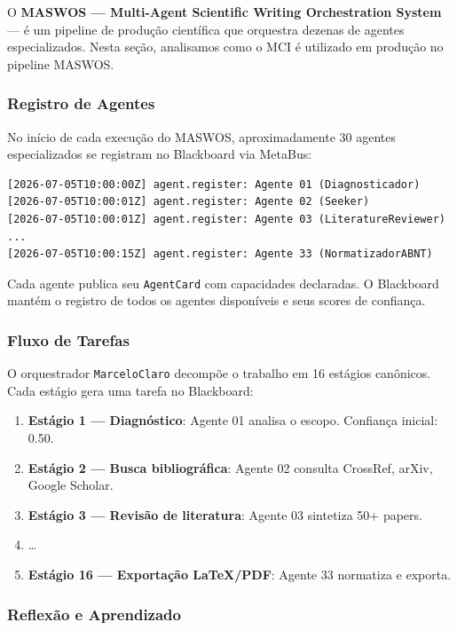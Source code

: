 O \textbf{MASWOS — Multi-Agent Scientific Writing Orchestration System} — é um pipeline de produção científica que orquestra dezenas de agentes especializados. Nesta seção, analisamos como o MCI é utilizado em produção no pipeline MASWOS.

\subsubsection{Registro de Agentes}

No início de cada execução do MASWOS, aproximadamente 30 agentes especializados se registram no Blackboard via MetaBus:

\begin{verbatim}
[2026-07-05T10:00:00Z] agent.register: Agente 01 (Diagnosticador)
[2026-07-05T10:00:01Z] agent.register: Agente 02 (Seeker)
[2026-07-05T10:00:01Z] agent.register: Agente 03 (LiteratureReviewer)
...
[2026-07-05T10:00:15Z] agent.register: Agente 33 (NormatizadorABNT)
\end{verbatim}

Cada agente publica seu \texttt{AgentCard} com capacidades declaradas. O Blackboard mantém o registro de todos os agentes disponíveis e seus scores de confiança.

\subsubsection{Fluxo de Tarefas}

O orquestrador \texttt{MarceloClaro} decompõe o trabalho em 16 estágios canônicos. Cada estágio gera uma tarefa no Blackboard:

\begin{enumerate}
    \item \textbf{Estágio 1 — Diagnóstico}: Agente 01 analisa o escopo. Confiança inicial: 0.50.
    \item \textbf{Estágio 2 — Busca bibliográfica}: Agente 02 consulta CrossRef, arXiv, Google Scholar.
    \item \textbf{Estágio 3 — Revisão de literatura}: Agente 03 sintetiza 50+ papers.
    \item \dots
    \item \textbf{Estágio 16 — Exportação LaTeX/PDF}: Agente 33 normatiza e exporta.
\end{enumerate}

\subsubsection{Reflexão e Aprendizado}

